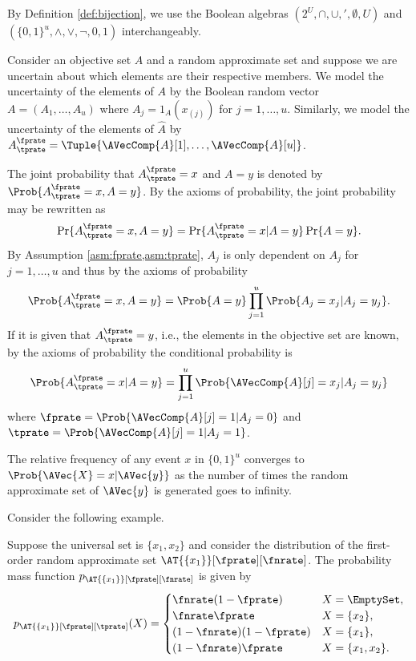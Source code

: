 \documentclass[
]{article}
\begin{document}
By Definition \ref{def:bijection}, we use the Boolean algebras
\(\left(2^U,\cap,\cup,',\emptyset,U\right)\) and
\((\{0,1\}^u,\land,\lor,\neg,0,1)\) interchangeably.

Consider an objective set \(A\) and a random approximate set and suppose
we are uncertain about which elements are their respective members. We
model the uncertainty of the elements of \(A\) by the Boolean random
vector \(A = (A_1,\ldots,A_u)\) where
\(A_j = 1_{A}\left(x_{(j)}\right)\) for \(j=1,\ldots,u\). Similarly, we
model the uncertainty of the elements of \(\hat A\) by
\(A_{\tprate}^{\fprate} = \Tuple{\AVecComp{A}[1],\ldots,\AVecComp{A}[u]}\).

The joint probability that \(A_{\tprate}^{\fprate} = x\) and \(A = y\)
is denoted by \(\Prob{A_{\tprate}^{\fprate} = x,A = y}\). By the axioms
of probability, the joint probability may be rewritten as \[
\Pr\{A_{\tprate}^{\fprate} = x,A = y\} =
    \Pr\{A_{\tprate}^{\fprate} = x | A = y\}
    \Pr\{A = y\}.
\] By Assumption \ref{asm:fprate,asm:tprate}, \(A_j\) is only dependent
on \(A_j\) for \(j=1,\ldots,u\) and thus by the axioms of probability
\begin{equation}
    \Prob{A_{\tprate}^{\fprate} = x,A = y} = 
    \Prob{A = y} 
        \prod_{j=1}^{u} \Prob{A_j = x_j | A_j = y_j}.
\end{equation} If it is given that \(A_{\tprate}^{\fprate} = y\), i.e.,
the elements in the objective set are known, by the axioms of
probability the conditional probability is \begin{equation}
    \Prob{A_{\tprate}^{\fprate} = x | A = y} = \prod_{j=1}^{u} 
    \Prob{\AVecComp{A}[j] = x_j | A_j = y_j}
\end{equation} where \(\fprate = \Prob{\AVecComp{A}[j]=1 | A_j=0}\) and
\(\tprate = \Prob{\AVecComp{A}[j]=1 | A_j=1}\).

The relative frequency of any event \(x\) in \(\{0,1\}^u\) converges to
\(\Prob{\AVec{X} = x | \AVec{y}}\) as the number of times the random
approximate set of \(\AVec{y}\) is generated goes to infinity.

Consider the following example.

\begin{example}
    Suppose the universal set is $\{ x_1,x_2 \}$ and consider the distribution of the first-order random approximate set $\AT{\{x_1\}}[\fprate][\fnrate]$.
    The probability mass function $p_{\AT{\{x_1\}}[\fprate][\fnrate]}$ is given by
    \begin{equation}
    p_{\AT{\{x_1\}}[\fprate][\tprate]}(X) =
    \begin{cases} 
    \fnrate (1-\fprate) & X = \EmptySet,\\
    \fnrate \fprate     & X = \{x_2\},\\
    (1-\fnrate)(1-\fprate)     & X = \{x_1\},\\
    (1-\fnrate)\fprate         & X = \{x_1,x_2\}.
    \end{cases}
    \end{equation}
\end{example}
\end{document}
